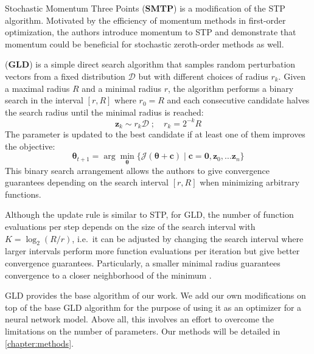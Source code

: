 Stochastic Momentum Three Points (\textbf{SMTP}) \parencite{smtp}
is a modification of the \ac{STP} algorithm.
Motivated by the
efficiency of momentum methods in first-order optimization, 
the authors introduce momentum to \ac{STP} and 
demonstrate that momentum could be beneficial
for stochastic zeroth-order methods as well. 

 (\textbf{\acs{GLD}}) \parencite{gld} is a simple direct 
search algorithm that
samples random perturbation vectors from a fixed
distribution $\mathcal{D}$ but with different choices of 
radius $r_k$. Given a maximal radius $R$ and a 
minimal radius $r$, the algorithm performs a binary 
search in the interval $[r, R]$ where $r_0 = R$ and 
each consecutive candidate halves the search radius 
until the minimal radius is reached: 
\begin{equation}
    \mathbf{z}_k \sim r_k \mathcal{D} \;;\quad r_k = 2^{-k} R
\end{equation}
The parameter is updated to the best candidate if at least
one of them improves the objective:
\begin{equation}
    \bm{\theta}_{t+1} = \arg\min_{\bm{\theta}} \{\mathcal{J}(\bm{\theta} + \mathbf{c}) \mid \mathbf{c} = \mathbf{0}, \mathbf{z}_0, \dots \mathbf{z}_n\}
\end{equation}
This binary search arrangement
allows the authors to give convergence guarantees
depending on the search interval $[r, R]$
when minimizing arbitrary functions.

Although the update rule is similar to \ac{STP}, 
for \ac{GLD}, 
the number of function evaluations per step 
depends on the size of the search interval 
with $K=\log_2(R/r)$, i.e.\ it can be adjusted 
by changing the search interval where larger intervals
perform more function evaluations per iteration but 
give better convergence guarantees. Particularly, a 
smaller minimal radius guarantees convergence to a 
closer neighborhood of the minimum \parencite{gld}. 

\ac{GLD} provides the base algorithm of our work. 
We add our own modifications on top of the 
base \ac{GLD} algorithm for the purpose of using it as 
an optimizer for a neural network model. Above all, this involves an 
effort to overcome the limitations 
on the number of parameters. 
Our methods will be detailed in \autoref{chapter:methods}.

    
